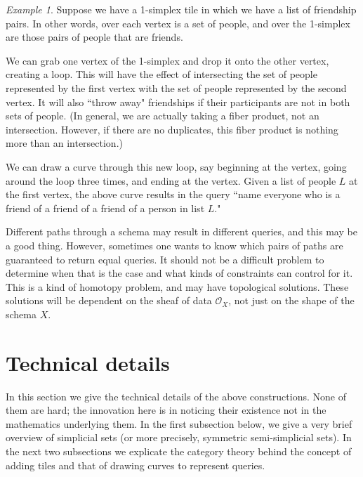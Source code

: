 \documentclass{amsart}
\def\mc{\mathcal}
\def\mcO{\mc{O}}
\theoremstyle{remark}
\newtheorem{example}[theorem]{Example}
\theoremstyle{definition}
\begin{document}
\begin{example}

Suppose we have a 1-simplex tile in which we have a list of friendship pairs.  In other words, over each vertex is a set of people, and over the 1-simplex are those pairs of people that are friends.  

We can grab one vertex of the 1-simplex and drop it onto the other vertex, creating a loop.  This will have the effect of intersecting the set of people represented by the first vertex with the set of people represented by the second vertex.  It will also ``throw away" friendships if their participants are not in both sets of people.  (In general, we are actually taking a fiber product, not an intersection.  However, if there are no duplicates, this fiber product is nothing more than an intersection.)

We can draw a curve through this new loop, say beginning at the vertex, going around the loop three times, and ending at the vertex.  Given a list of people $L$ at the first vertex, the above curve results in the query ``name everyone who is a friend of a friend of a friend of a person in list $L$."    

\end{example}

Different paths through a schema may result in different queries, and this may be a good thing.  However, sometimes one wants to know which pairs of paths are guaranteed to return equal queries.  It should not be a difficult problem to determine when that is the case and what kinds of constraints can control for it.  This is a kind of homotopy problem, and may have topological solutions.  These solutions will be dependent on the sheaf of data $\mcO_X$, not just on the shape of the schema $X$.

\appendix

\section{Technical details}\label{sec:technical}

In this section we give the technical details of the above constructions.  None of them are hard; the innovation here is in noticing their existence not in the mathematics underlying them.  In the first subsection below, we give a very brief overview of simplicial sets (or more precisely, symmetric semi-simplicial sets).  In the next two subsections we explicate the category theory behind the concept of adding tiles and that of drawing curves to represent queries.
\end{document}
